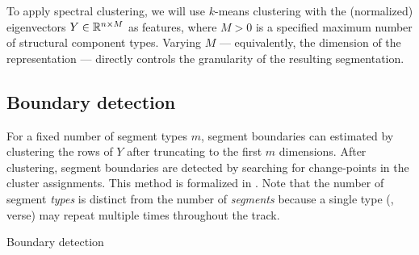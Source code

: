 \documentclass{article}
\begin{document}
To apply spectral clustering, we will use $k$-means clustering with the (normalized) 
eigenvectors $Y \in \mathbb{R}^{n \times M}$ as features, where $M > 0$ is a 
specified maximum number of structural component types.  Varying $M$ --- equivalently, 
the dimension of the representation --- directly controls the granularity of 
the resulting segmentation.


\subsection{Boundary detection}
For a fixed number of segment types $m$, segment boundaries can estimated 
by clustering the rows of $Y$ after truncating to the first $m$ dimensions.
After clustering, segment boundaries are detected by searching for change-points in
the cluster assignments.  This method is formalized in .
Note that the number of segment \emph{types} is distinct from the number of \emph{segments} because a single 
type (\eg, verse) may repeat multiple times throughout the track.

\begin{algorithm}[t]
\caption{Boundary detection}\label{bd}
\begin{algorithmic}[1]
\EndFunction{}
\end{algorithmic}
\end{algorithm}

\end{document}
